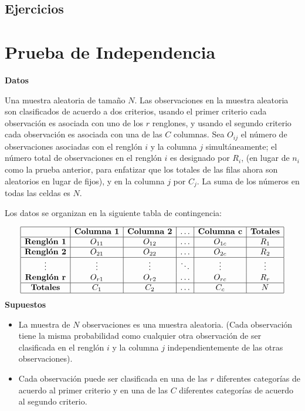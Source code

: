 \documentclass[
  a4paper,
  oneside,
  openany]{book}
\begin{document}
\hypertarget{ejercicios-4}{%
\section{Ejercicios}\label{ejercicios-4}}

\hypertarget{prueba-de-independencia}{%
\chapter{Prueba de Independencia}\label{prueba-de-independencia}}

\textbf{Datos}

Una muestra aleatoria de tamaño \(N\). Las observaciones en la muestra aleatoria son clasificados de acuerdo a dos criterios, usando el primer criterio cada observación es asociada con uno de los \(r\) renglones, y usando el segundo criterio cada observación es asociada con una de las \(C\) columnas.
Sea \(O_{ij}\) el número de observaciones asociadas con el renglón \(i\) y la columna \(j\) simultáneamente; el número total de observaciones en el renglón \(i\) es designado por \(R_{i}\), (en lugar de \(n_{i}\) como la prueba anterior, para enfatizar que los totales de las filas ahora son aleatorios en lugar de fijos), y en la columna \(j\) por \(C_{j}\). La suma de los números en todas las celdas es \(N\).

Los datos se organizan en la siguiente tabla de contingencia:

\[
\begin{array}{|c|c|c|c|c|c|} 
\hline
&\textbf{Columna 1} &\textbf{Columna 2} &\ldots&\textbf{Columna c}&\textbf{Totales}\\
\hline
\textbf{Renglón 1} &O_{11} &O_{12} &\ldots&O_{1c}&R_1\\
\hline
\textbf{Renglón 2} &O_{21} &O_{22} &\ldots&O_{2c}&R_2\\
\hline
\vdots& \vdots& \vdots& \ddots&\vdots& \vdots\\
\textbf{Renglón r}&O_{r1} &O_{r2} &\ldots&O_{rc}&R_r\\
\hline
\textbf{Totales}&C_1&C_2&\ldots&C_c&N\\
\hline
\end {array}
\]
\textbf{Supuestos}

\begin{itemize}
\item
  La muestra de \(N\) observaciones es una muestra aleatoria. (Cada observación tiene la misma probabilidad como cualquier otra observación de ser clasificada en el renglón \(i\) y la columna \(j\) independientemente de las otras observaciones).
\item
  Cada observación puede ser clasificada en una de las \(r\) diferentes categorías de acuerdo al primer criterio y en una de las \(C\) diferentes categorías de acuerdo al segundo criterio.
\end{itemize}
\end{document}
